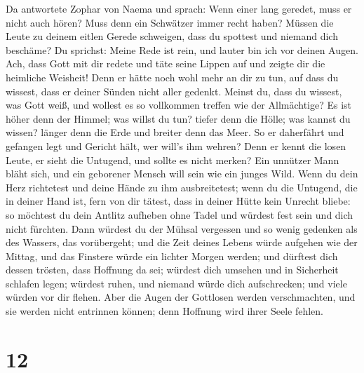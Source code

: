  Da antwortete Zophar von Naema und sprach: 
Wenn einer lang geredet, muss er nicht auch hören? Muss denn ein
Schwätzer immer recht haben?  Müssen die Leute zu deinem
eitlen Gerede schweigen, dass du spottest und niemand dich beschäme?
 Du sprichst: Meine Rede ist rein, und lauter bin ich vor
deinen Augen.  Ach, dass Gott mit dir redete und täte
seine Lippen auf  und zeigte dir die heimliche Weisheit!
Denn er hätte noch wohl mehr an dir zu tun, auf dass du wissest, dass er
deiner Sünden nicht aller gedenkt.  Meinst du, dass du
wissest, was Gott weiß, und wollest es so vollkommen treffen wie der
Allmächtige?  Es ist höher denn der Himmel; was willst du
tun? tiefer denn die Hölle; was kannst du wissen?  länger
denn die Erde und breiter denn das Meer.  So er
daherfährt und gefangen legt und Gericht hält, wer will's ihm wehren?
 Denn er kennt die losen Leute, er sieht die Untugend,
und sollte es nicht merken?  Ein unnützer Mann bläht
sich, und ein geborener Mensch will sein wie ein junges Wild.
 Wenn du dein Herz richtetest und deine Hände zu ihm
ausbreitetest;  wenn du die Untugend, die in deiner Hand
ist, fern von dir tätest, dass in deiner Hütte kein Unrecht bliebe:
 so möchtest du dein Antlitz aufheben ohne Tadel und
würdest fest sein und dich nicht fürchten.  Dann würdest
du der Mühsal vergessen und so wenig gedenken als des Wassers, das
vorübergeht;  und die Zeit deines Lebens würde aufgehen
wie der Mittag, und das Finstere würde ein lichter Morgen werden;
 und dürftest dich dessen trösten, dass Hoffnung da sei;
würdest dich umsehen und in Sicherheit schlafen legen; 
würdest ruhen, und niemand würde dich aufschrecken; und viele würden vor
dir flehen.  Aber die Augen der Gottlosen werden
verschmachten, und sie werden nicht entrinnen können; denn Hoffnung wird
ihrer Seele fehlen.

\hypertarget{section-11}{%
\section{12}\label{section-11}}

